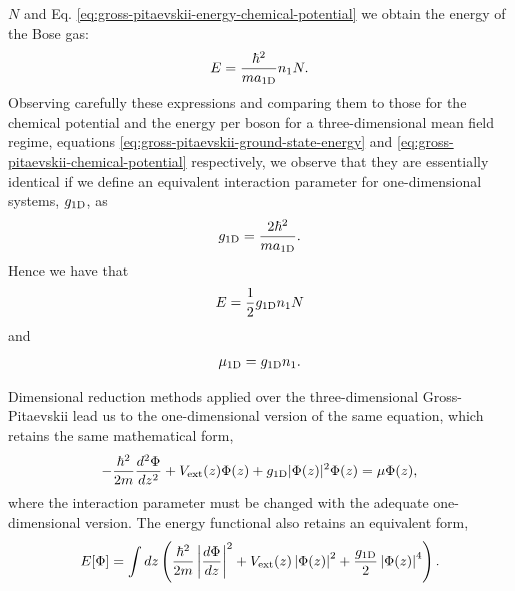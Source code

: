 $N$ and Eq. \eqref{eq:gross-pitaevskii-energy-chemical-potential} we obtain the
energy of the Bose gas:
%
\begin{equation}
  E = \frac{\hbar^2}{m a_{ \mathrm{1D} }} n_1 N.
\end{equation}
%
Observing carefully these expressions and comparing them to those for the
chemical potential and the energy per boson for a three-dimensional mean field
regime, equations \eqref{eq:gross-pitaevskii-ground-state-energy} and
\eqref{eq:gross-pitaevskii-chemical-potential} respectively, we observe that
they are essentially identical if we define an equivalent interaction parameter
for one-dimensional systems, $g_{ \mathrm{1D} }$, as
%
\begin{equation}
  \label{eq:gross-pitaevskii-interaction-parameter-1d}
  g_{ \mathrm{1D} } = \frac{2 \hbar^2}{m a_{ \mathrm{1D} }}.
\end{equation}
%
Hence we have that
%
\begin{equation}
  \label{eq:gross-pitaevskii-1d-energy}
  E = \frac{1}{2} g_{ \mathrm{1D} } n_1 N
\end{equation}
%
and
%
\begin{equation}
  \label{eq:gross-pitaevskii-1d-chemical-potential}
  \mu_\mathrm{1D} = g_{ \mathrm{1D} } n_1.
\end{equation}
%

Dimensional reduction methods \cite{bib:lieb-j-commun-math-Phys.224.17.2001,
  bib:cai-rosenkranzs-phys-rev-A.82.043623} applied over the three-dimensional
Gross-Pitaevskii lead us to the one-dimensional version of the same equation,
which retains the same mathematical form,
%
\begin{equation}
  \label{eq:gross-pitaevskii-equation-1d}
  -\frac{\hbar^2}{2m}\frac{d^2\Phi}{dz^2} + V_{\mathrm{ext}}(z) \Phi(z) + g_{ \mathrm{1D} } |\Phi(z)|^2 \Phi(z)
  = \mu \Phi(z),
\end{equation}
%
where the interaction parameter must be changed with the adequate
one-dimensional version. The energy functional also retains an equivalent form,
%
\begin{equation}
  \label{eq:gross-pitaevskii-1d-energy-functional}
  E[{\Phi}] = \int dz \left( \frac{\hbar^2}{2m} \left| \frac{d{\Phi}}{dz} \right|^2 + V_{\mathrm{ext}}(z) \left| {\Phi}(z) \right|^2 + \frac{g_{ \mathrm{1D} }}{2} \left| {\Phi}(z) \right|^4  \right).
\end{equation}


